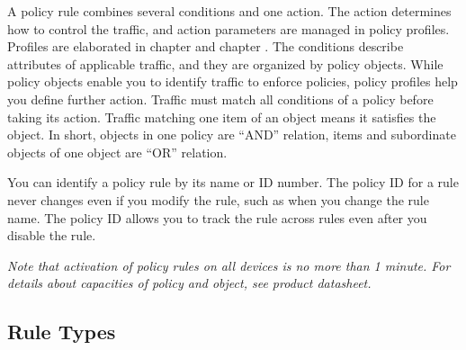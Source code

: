 A policy rule combines several conditions and one action. The action determines how to control the traffic, and action parameters are managed in policy profiles. 
Profiles are elaborated in chapter \hyperlink{link:Certificate Managements}{\color{linkblue}{Certificate Managements}}  and chapter \hyperlink{link:Proxy Profiles}{\color{linkblue}{Proxy Profiles}}. 
The conditions describe attributes of applicable traffic, and they are organized by policy objects. 
While policy objects enable you to identify traffic to enforce policies, policy profiles help you define further action.  Traffic must match all conditions of a policy before taking its action. 
Traffic matching one item of an object means it satisfies the object. In short, objects in one policy are “AND” relation, items and subordinate objects of one object are “OR” relation. 


You can identify a policy rule by its name or ID number. The policy ID for a rule never changes even if you modify the rule, such as when you change the rule name. 
The policy ID allows you to track the rule across rules even after you disable the rule.


\notemark\textit{Note that activation of policy rules on all devices is no more than 1 minute. 
For details about capacities of policy and object, see product datasheet.}

\subsection*{\hypertarget{link:Rule Types}{Rule Types}}
\label{sec:policies:concepts:types}

